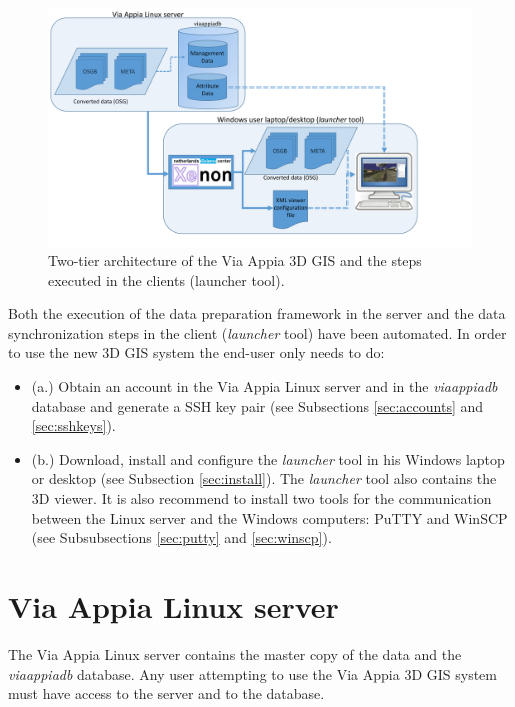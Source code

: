 \documentclass[a4paper,11pt]{article}
\begin{document}
\begin{figure}[!ht]
\centering
\includegraphics[scale=0.5]{fig/communication.pdf}
\caption{Two-tier architecture of the Via Appia 3D GIS and the steps executed in the clients (launcher tool).}
\label{fig-communication}
\end{figure}

Both the execution of the data preparation framework in the server and the data synchronization steps in the client (\textit{launcher} tool) have been automated. In order to use the new 3D GIS system the end-user only needs to do:
\begin{itemize}
\item (a.) Obtain an account in the Via Appia Linux server and in the \textit{viaappiadb} database and generate a SSH key pair (see Subsections \ref{sec:accounts} and \ref{sec:sshkeys}).
\item (b.) Download, install and configure the \textit{launcher} tool in his Windows laptop or desktop (see Subsection \ref{sec:install}).  The \textit{launcher} tool also contains the 3D viewer. It is also recommend to install two tools for the communication between the Linux server and the Windows computers: PuTTY and WinSCP (see Subsubsections \ref{sec:putty} and \ref{sec:winscp}).
\end{itemize}

\section{Via Appia Linux server}
\label{sec:server}

The Via Appia Linux server contains the master copy of the data and the \textit{viaappiadb} database. Any user attempting to use the Via Appia 3D GIS system must have access to the server and to the database.
\end{document}

